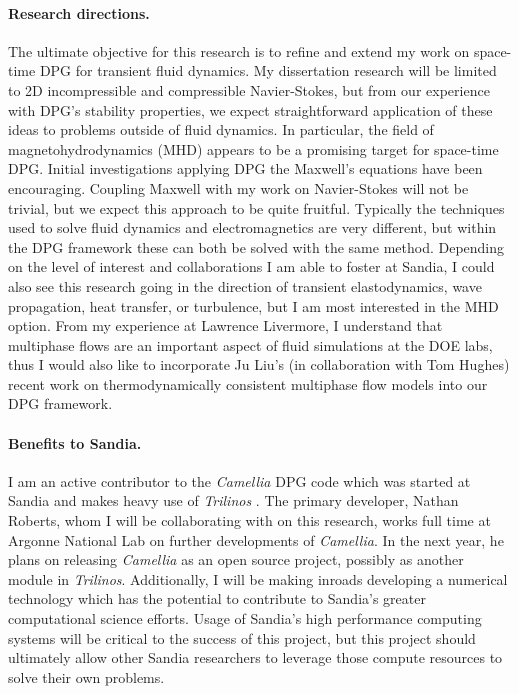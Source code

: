 \documentclass[letterpaper]{article}
\begin{document}
\paragraph{Research directions.}
The ultimate objective for this research is to refine and extend my work on space-time DPG for transient fluid dynamics.
My dissertation research will be limited to 2D incompressible and compressible Navier-Stokes, 
but from our experience with DPG's stability properties, we expect straightforward application of these ideas to problems outside of fluid dynamics.
In particular, the field of magnetohydrodynamics (MHD) appears to be a promising target for space-time DPG.
Initial investigations applying DPG the Maxwell's equations have been encouraging.
Coupling Maxwell with my work on Navier-Stokes will not be trivial, but we expect this approach to be quite fruitful.
Typically the techniques used to solve fluid dynamics and electromagnetics are very different, but within the DPG framework these can both be solved
with the same method.
Depending on the level of interest and collaborations I am able to foster at Sandia, 
I could also see this research going in the direction of transient elastodynamics, wave propagation, heat transfer, or turbulence,
but I am most interested in the MHD option.
From my experience at Lawrence Livermore, I understand that multiphase flows are an important aspect of fluid 
simulations at the DOE labs, thus
I would also like to incorporate Ju Liu's (in collaboration with Tom Hughes) recent work on thermodynamically consistent multiphase flow models
into our DPG framework.


\paragraph{Benefits to Sandia.}
I am an active contributor to the \emph{Camellia} \cite{CamelliaDPG} DPG code which was started at Sandia and makes heavy use of \emph{Trilinos} \cite{Trilinos}.
The primary developer, Nathan Roberts, whom I will be collaborating with on this research, works full time at Argonne National Lab on further developments of 
\emph{Camellia}. In the next year, he plans on releasing \emph{Camellia} as an open source project, possibly as another module in \emph{Trilinos}.
Additionally, I will be making inroads developing a numerical technology which has the potential to 
contribute to Sandia's greater computational science efforts.
Usage of Sandia's high performance computing systems will be critical to the success of this project, but this project should ultimately
allow other Sandia researchers to leverage those compute resources to solve their own problems.
\end{document}
